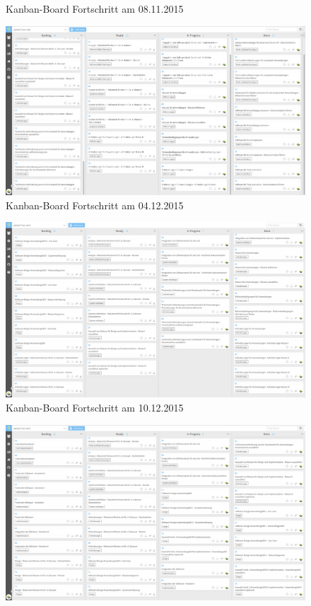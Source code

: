 \begin{landscape}
\begin{figure}[H]
  \caption[Kanban-Board 08.11.2015]{Kanban-Board Fortschritt am 08.11.2015}
\end{figure}
\begin{figure}[H]
  \centering
  \includegraphics[scale=0.37]{98_Bilder/98_Anhang/20151204_Kanban_board}
  \caption[Kanban-Board 04.12.2015]{Kanban-Board Fortschritt am 04.12.2015}
\end{figure}
\begin{figure}[H]
  \centering
  \includegraphics[scale=0.37]{98_Bilder/98_Anhang/20151210_Kanban_board}
  \caption[Kanban-Board 10.12.2015]{Kanban-Board Fortschritt am 10.12.2015}
\end{figure}
\begin{figure}[H]
  \centering
  \includegraphics[scale=0.37]{98_Bilder/98_Anhang/20151216_Kanban_board}

\end{figure}
\end{landscape}
